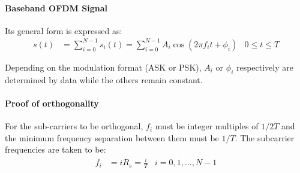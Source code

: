 \paragraph{Baseband OFDM Signal} Its general form is expressed as:
\begin{align*}
	s(t) &= \sum_{i=0}^{N-1}s_i(t) = \sum_{i=0}^{N-1}A_i \cos (2\pi f_i t + \phi_i) & 0 \leq t \leq T
\end{align*}
\begin{mathDef}
\end{mathDef}
Depending on the modulation format (\gls{ASK} or \gls{PSK}), \(A_i\) or \(\phi_i\) respectively are determined by data while the others remain constant.
\paragraph{Proof of orthogonality} For the sub-carriers to be orthogonal, \(f_i\) must be integer multiples of \(1/2T\) and the minimum frequency separation between them must be \(1/T\). The subcarrier frequencies are taken to be:
\begin{align}
	f_i &= iR_s = \frac{i}{T} & i = 0, 1, \ldots, N-1
\end{align}
\begin{mathDef}
\end{mathDef}

